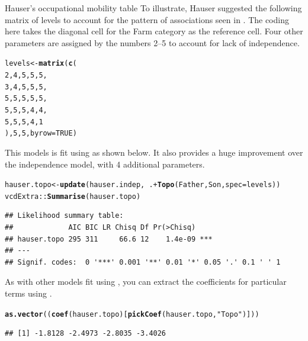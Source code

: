 \documentclass[11pt]{book}\usepackage[]{graphicx}\usepackage[]{color}
\makeatletter
\newcommand{\hlnum}[1]{\textcolor[rgb]{0.686,0.059,0.569}{#1}}%
\newcommand{\hlstr}[1]{\textcolor[rgb]{0.192,0.494,0.8}{#1}}%
\newcommand{\hlopt}[1]{\textcolor[rgb]{0,0,0}{#1}}%
\newcommand{\hlstd}[1]{\textcolor[rgb]{0.345,0.345,0.345}{#1}}%
\newcommand{\hlkwb}[1]{\textcolor[rgb]{0.69,0.353,0.396}{#1}}%
\newcommand{\hlkwc}[1]{\textcolor[rgb]{0.333,0.667,0.333}{#1}}%
\newcommand{\hlkwd}[1]{\textcolor[rgb]{0.737,0.353,0.396}{\textbf{#1}}}%
\newenvironment{kframe}{%
 \def\at@end@of@kframe{}%
 \ifinner\ifhmode%
  \def\at@end@of@kframe{\end{minipage}}%
  \begin{minipage}{\columnwidth}%
 \fi\fi%
 \def\FrameCommand##1{\hskip\@totalleftmargin \hskip-\fboxsep
 \colorbox{shadecolor}{##1}\hskip-\fboxsep
     \hskip-\linewidth \hskip-\@totalleftmargin \hskip\columnwidth}%
 \MakeFramed {\advance\hsize-\width
   \@totalleftmargin\z@ \linewidth\hsize
   \@setminipage}}%
 {\par\unskip\endMakeFramed%
 \at@end@of@kframe}
\newenvironment{knitrout}{}{} %
\renewenvironment{knitrout}{\small\renewcommand{\baselinestretch}{.85}}{} %
\makeatother
\begin{document}
\begin{Example}[hauser1]{Hauser's occupational mobility table}
To illustrate, Hauser suggested the following matrix of levels
to account for the pattern of associations seen in .
The coding here takes the diagonal cell for the Farm category as the reference
cell. Four other parameters are assigned by the numbers 2--5 to account for lack
of independence.
\begin{knitrout}
\color{fgcolor}\begin{kframe}
\begin{alltt}
\hlstd{levels} \hlkwb{<-} \hlkwd{matrix}\hlstd{(}\hlkwd{c}\hlstd{(}
  \hlnum{2}\hlstd{,}  \hlnum{4}\hlstd{,}  \hlnum{5}\hlstd{,}  \hlnum{5}\hlstd{,}  \hlnum{5}\hlstd{,}
  \hlnum{3}\hlstd{,}  \hlnum{4}\hlstd{,}  \hlnum{5}\hlstd{,}  \hlnum{5}\hlstd{,}  \hlnum{5}\hlstd{,}
  \hlnum{5}\hlstd{,}  \hlnum{5}\hlstd{,}  \hlnum{5}\hlstd{,}  \hlnum{5}\hlstd{,}  \hlnum{5}\hlstd{,}
  \hlnum{5}\hlstd{,}  \hlnum{5}\hlstd{,}  \hlnum{5}\hlstd{,}  \hlnum{4}\hlstd{,}  \hlnum{4}\hlstd{,}
  \hlnum{5}\hlstd{,}  \hlnum{5}\hlstd{,}  \hlnum{5}\hlstd{,}  \hlnum{4}\hlstd{,}  \hlnum{1}
  \hlstd{),} \hlnum{5}\hlstd{,} \hlnum{5}\hlstd{,} \hlkwc{byrow}\hlstd{=}\hlnum{TRUE}\hlstd{)}
\end{alltt}
\end{kframe}
\end{knitrout}
This models is fit using  as shown below. It also provides a huge
improvement over the independence model, with 4 additional parameters.
\begin{knitrout}
\color{fgcolor}\begin{kframe}
\begin{alltt}
\hlstd{hauser.topo} \hlkwb{<-} \hlkwd{update}\hlstd{(hauser.indep,} \hlopt{~} \hlstd{.} \hlopt{+} \hlkwd{Topo}\hlstd{(Father, Son,} \hlkwc{spec}\hlstd{=levels))}
\hlstd{vcdExtra::}\hlkwd{Summarise}\hlstd{(hauser.topo)}
\end{alltt}
\begin{verbatim}
## Likelihood summary table:
##             AIC BIC LR Chisq Df Pr(>Chisq)    
## hauser.topo 295 311     66.6 12    1.4e-09 ***
## ---
## Signif. codes:  0 '***' 0.001 '**' 0.01 '*' 0.05 '.' 0.1 ' ' 1
\end{verbatim}
\end{kframe}
\end{knitrout}
As with other models fit using , you can extract the coefficients
for particular terms using .
\begin{knitrout}
\color{fgcolor}\begin{kframe}
\begin{alltt}
\hlkwd{as.vector}\hlstd{((}\hlkwd{coef}\hlstd{(hauser.topo)[}\hlkwd{pickCoef}\hlstd{(hauser.topo,} \hlstr{"Topo"}\hlstd{)]))}
\end{alltt}
\begin{verbatim}
## [1] -1.8128 -2.4973 -2.8035 -3.4026
\end{verbatim}
\end{kframe}
\end{knitrout}


\end{Example}
\end{document}
